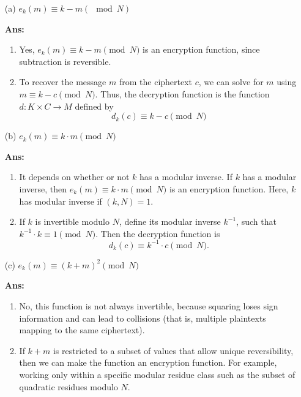 \documentclass[12pt]{ut-thesis}
\theoremstyle{definition}
\begin{document}
    \begin{itemize}
        \item[(a)] $e_k(m) \equiv k - m(\mod N)$
        
        \textbf{Ans:}
        \begin{enumerate}
            \item Yes, $e_k(m) \equiv k - m\pmod N$ is an encryption function, 
            since subtraction is reversible. 
            \item To recover the message $m$ from the ciphertext $c$, we can solve for $m$ using
            $m \equiv k - c \pmod{N}$. Thus, the decryption function is the function $d:K\times C \rightarrow M$
            defined by  $$d_k(c) \equiv k - c \pmod{N}$$ 
        \end{enumerate}
        \item[(b)] $e_k(m) \equiv k \cdot m\pmod N$
        
        \textbf{Ans:}
        \begin{enumerate}
            \item It depends on whether or not $k$ has a modular inverse. 
            If $k$ has a modular inverse, then  $e_k(m) \equiv k\cdot m\pmod N$ is an encryption function. 
            Here, $k$ has modular inverse if $(k, N) = 1$.
            \item  If $k$ is invertible modulo $N$, define its modular inverse 
            $k^{-1}$, such that $k^{-1} \cdot k \equiv 1 \pmod{N}$. Then the decryption function is  
            $$d_k(c) \equiv k^{-1} \cdot c \pmod{N}.$$
        \end{enumerate}
        \item[(c)] $e_k(m) \equiv (k + m)^2\pmod N$
        
        \textbf{Ans:}
        \begin{enumerate}
            \item No, this function is not always invertible, because squaring loses 
            sign information and can lead to collisions (that is, multiple plaintexts mapping to the same ciphertext).

            \item  If $k + m$ is restricted to a subset of values that allow unique reversibility, then we can
            make the function an encryption function. For example, working only within a specific modular residue class
            such as the subset of quadratic residues modulo $N$.


        \end{enumerate}
    \end{itemize}
    
\end{document}
